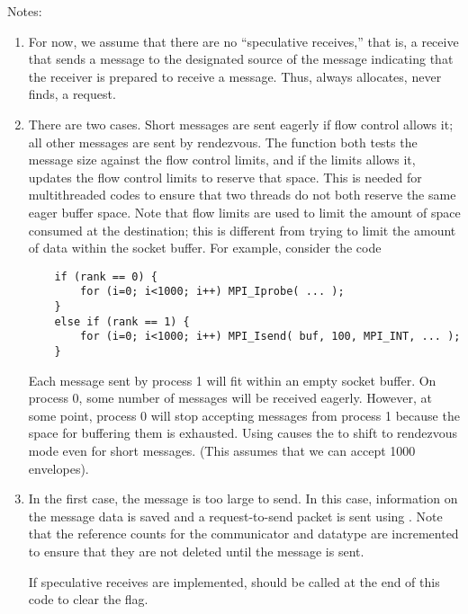\ifcodefirst
\else
{}
\fi


\ifcodefirst
{}
\fi

Notes:
\begin{enumerate}
\item For now, we assume that there are no ``speculative receives,'' that is,
  a receive that sends a message to the designated source of the message
  indicating that the receiver is prepared to receive a message.  Thus, 
   always allocates, never finds, a request.

\item There are two cases.  Short messages are sent eagerly if flow control
  allows it; all other messages are sent by rendezvous.  
  The function  both tests the message size against
  the flow control limits, and if the limits allows it, updates the flow
  control limits to reserve that space.  This is needed for multithreaded
  codes to ensure that two threads do not both reserve the same eager buffer
  space.  Note that flow limits are used to limit the amount of space consumed
  at the destination; this is different from trying to limit the amount of
  data within the socket buffer.  For example, consider the code
\begin{verbatim}
    if (rank == 0) {
        for (i=0; i<1000; i++) MPI_Iprobe( ... );
    } 
    else if (rank == 1) {
        for (i=0; i<1000; i++) MPI_Isend( buf, 100, MPI_INT, ... );
    }
\end{verbatim}
  Each message sent by process 1 will fit within an empty socket buffer.  
  On process 0, some number of messages will be received eagerly.  However, at
  some point, process 0 will stop accepting messages from process 1 because
  the space for buffering them is exhausted.  Using 
  causes the  to shift to rendezvous mode even for short
  messages.  (This assumes that we can accept 1000 envelopes).

\item In the first case, the message is too large to send.  In this case,
  information on the message data is saved and a request-to-send packet is
  sent using .  Note that the reference counts for the
  communicator and datatype are incremented to ensure that they are not
  deleted until the message is sent.

  If speculative receives are implemented, 
  should be called at the end of this code to clear the  flag.


\end{enumerate}
